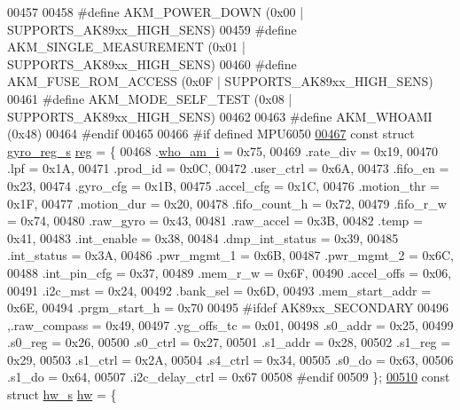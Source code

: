 \begin{DoxyCode}
00457 
00458 \textcolor{preprocessor}{#define AKM\_POWER\_DOWN          (0x00 | SUPPORTS\_AK89xx\_HIGH\_SENS)}
00459 \textcolor{preprocessor}{#define AKM\_SINGLE\_MEASUREMENT  (0x01 | SUPPORTS\_AK89xx\_HIGH\_SENS)}
00460 \textcolor{preprocessor}{#define AKM\_FUSE\_ROM\_ACCESS     (0x0F | SUPPORTS\_AK89xx\_HIGH\_SENS)}
00461 \textcolor{preprocessor}{#define AKM\_MODE\_SELF\_TEST      (0x08 | SUPPORTS\_AK89xx\_HIGH\_SENS)}
00462 
00463 \textcolor{preprocessor}{#define AKM\_WHOAMI      (0x48)}
00464 \textcolor{preprocessor}{#endif}
00465 
00466 \textcolor{preprocessor}{#if defined MPU6050}
\hypertarget{inv__mpu_8c_source.tex_l00467}{}\hyperlink{inv__mpu_8c_a5448c351fc95ff052b110eee80e5f75c}{00467} \textcolor{keyword}{const} \textcolor{keyword}{struct }\hyperlink{structgyro__reg__s}{gyro\_reg\_s} \hyperlink{inv__mpu_8c_a5448c351fc95ff052b110eee80e5f75c}{reg} = \{
00468     .\hyperlink{structgyro__reg__s_aa52d78bb2b62fee23a0b759e545dba4b}{who\_am\_i}       = 0x75,
00469     .rate\_div       = 0x19,
00470     .lpf            = 0x1A,
00471     .prod\_id        = 0x0C,
00472     .user\_ctrl      = 0x6A,
00473     .fifo\_en        = 0x23,
00474     .gyro\_cfg       = 0x1B,
00475     .accel\_cfg      = 0x1C,
00476     .motion\_thr     = 0x1F,
00477     .motion\_dur     = 0x20,
00478     .fifo\_count\_h   = 0x72,
00479     .fifo\_r\_w       = 0x74,
00480     .raw\_gyro       = 0x43,
00481     .raw\_accel      = 0x3B,
00482     .temp           = 0x41,
00483     .int\_enable     = 0x38,
00484     .dmp\_int\_status = 0x39,
00485     .int\_status     = 0x3A,
00486     .pwr\_mgmt\_1     = 0x6B,
00487     .pwr\_mgmt\_2     = 0x6C,
00488     .int\_pin\_cfg    = 0x37,
00489     .mem\_r\_w        = 0x6F,
00490     .accel\_offs     = 0x06,
00491     .i2c\_mst        = 0x24,
00492     .bank\_sel       = 0x6D,
00493     .mem\_start\_addr = 0x6E,
00494     .prgm\_start\_h   = 0x70
00495 \textcolor{preprocessor}{#ifdef AK89xx\_SECONDARY}
00496     ,.raw\_compass   = 0x49,
00497     .yg\_offs\_tc     = 0x01,
00498     .s0\_addr        = 0x25,
00499     .s0\_reg         = 0x26,
00500     .s0\_ctrl        = 0x27,
00501     .s1\_addr        = 0x28,
00502     .s1\_reg         = 0x29,
00503     .s1\_ctrl        = 0x2A,
00504     .s4\_ctrl        = 0x34,
00505     .s0\_do          = 0x63,
00506     .s1\_do          = 0x64,
00507     .i2c\_delay\_ctrl = 0x67
00508 \textcolor{preprocessor}{#endif}
00509 \};
\hypertarget{inv__mpu_8c_source.tex_l00510}{}\hyperlink{inv__mpu_8c_a7fefd0bb47e09b7e39e25e9795cd7edc}{00510} \textcolor{keyword}{const} \textcolor{keyword}{struct }\hyperlink{structhw__s}{hw\_s} \hyperlink{inv__mpu_8c_a7fefd0bb47e09b7e39e25e9795cd7edc}{hw} = \{

\end{DoxyCode}
